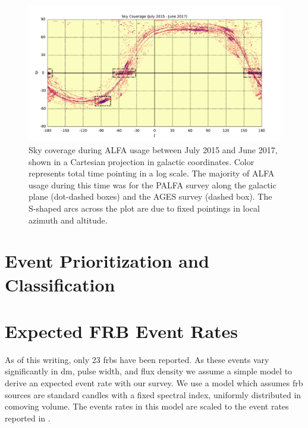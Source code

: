 \documentclass[a4paper,fleqn,usenatbib]{mnras}
\begin{document}
\begin{figure}
    \includegraphics[width=1.0\linewidth]{figures/cartview_sky_coverage.pdf}
    \caption{Sky coverage during ALFA usage between July 2015 and June 2017,
    shown in a Cartesian projection in galactic coordinates. Color represents
    total time pointing in a log scale. The majority of ALFA usage during this
    time was for the PALFA survey along the galactic plane (dot-dashed boxes)
    and the AGES survey (dashed box).  The S-shaped arcs across the plot are due
    to fixed pointings in local azimuth and altitude.
    }
    \label{fig:sky_coverage}
\end{figure}



\section{Event Prioritization and Classification}
\label{sec:event_classify}




\section{Expected FRB Event Rates}
\label{sec:event_rates}

As of this writing, only 23 \glspl{frb} have been reported. As these events vary
significantly in \gls{dm}, pulse width, and flux density we assume a simple
model to derive an expected event rate with our survey.  We use a model
\citep{2013MNRAS.436L...5L} which assumes \gls{frb} sources are standard candles
with a fixed spectral index, uniformly distributed in comoving volume. The
events rates in this model are scaled to the event rates reported in
\cite{2013Sci...341...53T}.
\end{document}
